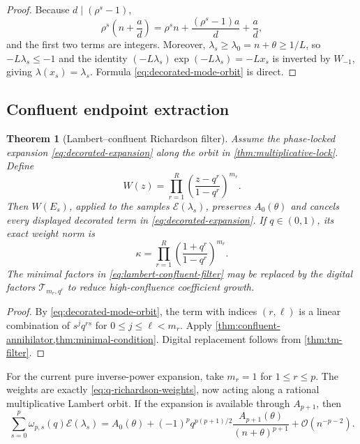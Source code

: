 \documentclass[11pt,oneside]{article}
\numberwithin{equation}{section}
\newtheorem{theorem}{Theorem}[section]
\theoremstyle{definition}
\theoremstyle{remark}
\newcommand{\bigO}{\mathcal O}
\begin{document}
\begin{proof}
Because $d\mid(\rho^s-1)$,
\[
 \rho^s\left(n+\frac ad\right)
 =\rho^sn+\frac{(\rho^s-1)a}{d}+\frac ad,
\]
and the first two terms are integers.  Moreover,
$\lambda_s\ge\lambda_0=n+\theta\ge1/L$, so
$-L\lambda_s\le-1$ and the identity
$(-L\lambda_s)\exp(-L\lambda_s)=-Lx_s$ is inverted by $W_{-1}$, giving
$\lambda(x_s)=\lambda_s$.  Formula \eqref{eq:decorated-mode-orbit} is direct.
\end{proof}

\subsection{Confluent endpoint extraction}

\begin{theorem}[Lambert--confluent Richardson filter]
\label{thm:lambert-confluent}
Assume the phase-locked expansion \eqref{eq:decorated-expansion} along the orbit in
\cref{thm:multiplicative-lock}.  Define
\begin{equation}
 W(z)=\prod_{r=1}^{R}
 \left(\frac{z-q^r}{1-q^r}\right)^{m_r}.
 \label{eq:lambert-confluent-filter}
\end{equation}
Then $W(E_s)$, applied to the samples
$\mathscr E(\lambda_s)$, preserves $A_0(\theta)$ and cancels every displayed decorated
term in \eqref{eq:decorated-expansion}.  If $q\in(0,1)$, its exact weight norm is
\begin{equation}
 \kappa
 =\prod_{r=1}^{R}\left(\frac{1+q^r}{1-q^r}\right)^{m_r}.
 \label{eq:lambert-confluent-condition}
\end{equation}
The minimal factors in \eqref{eq:lambert-confluent-filter} may be replaced by the digital
factors $\mathcal T_{m_r,q^r}$ to reduce high-confluence coefficient growth.
\end{theorem}

\begin{proof}
By \eqref{eq:decorated-mode-orbit}, the term with indices $(r,\ell)$ is a linear
combination of $s^jq^{rs}$ for $0\le j\le\ell<m_r$.  Apply
\cref{thm:confluent-annihilator,thm:minimal-condition}.  Digital replacement follows from
\cref{thm:tm-filter}.
\end{proof}

For the current pure inverse-power expansion, take $m_r=1$ for $1\le r\le p$.  The
weights are exactly \eqref{eq:q-richardson-weights}, now acting along a rational
multiplicative Lambert orbit.  If the expansion is available through $A_{p+1}$, then
\begin{equation}
 \sum_{s=0}^{p}\omega_{p,s}(q)\mathscr E(\lambda_s)
 =A_0(\theta)
 +(-1)^pq^{p(p+1)/2}\frac{A_{p+1}(\theta)}{(n+\theta)^{p+1}}
 +\bigO(n^{-p-2}).
 \label{eq:multiplicative-leading-error}
\end{equation}
\end{document}
